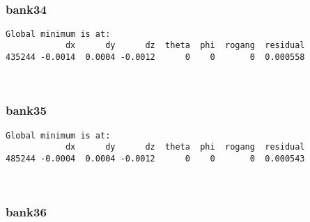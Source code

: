 \documentclass[11pt]{article}
\begin{document}
    \begin{center}
    \end{center}
    { \hspace*{\fill} \\}
    
    \hypertarget{bank34}{%
\subsubsection{bank34}\label{bank34}}

    \begin{Verbatim}[commandchars=\\\{\}]
Global minimum is at:
            dx      dy      dz  theta  phi  rogang  residual
435244 -0.0014  0.0004 -0.0012      0    0       0  0.000558
    \end{Verbatim}

    \begin{center}
    \end{center}
    { \hspace*{\fill} \\}
    
    \hypertarget{bank35}{%
\subsubsection{bank35}\label{bank35}}

    \begin{Verbatim}[commandchars=\\\{\}]
Global minimum is at:
            dx      dy      dz  theta  phi  rogang  residual
485244 -0.0004  0.0004 -0.0012      0    0       0  0.000543
    \end{Verbatim}

    \begin{center}
    \end{center}
    { \hspace*{\fill} \\}
    
    \hypertarget{bank36}{%
\subsubsection{bank36}\label{bank36}}
\end{document}
